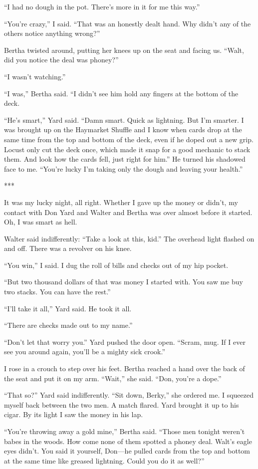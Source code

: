 \documentclass{novel}
\begin{document}
{“I had no dough in the pot. There’s more in it for me this way.”

“You’re crazy,” I said. “That was an honestly dealt hand. Why didn’t any of the others notice anything wrong?”

Bertha twisted around, putting her knees up on the seat and facing us. “Walt, did you notice the deal was phoney?”

“I wasn’t watching.”

“I was,” Bertha said. “I didn’t see him hold any fingers at the bottom of the deck.

“He’s smart,” Yard said. “Damn smart. Quick as lightning. But I’m smarter. I was brought up on the Haymarket Shuffle and I know when cards drop at the same time from the top and bottom of the deck, even if he doped out a new grip. Locust only cut the deck once, which made it snap for a good mechanic to stack them. And look how the cards fell, just right for him.” He turned his shadowed face to me. “You’re lucky I’m taking only the dough and leaving your health.”

***

It was my lucky night, all right. Whether I gave up the money or didn’t, my contact with Don Yard and Walter and Bertha was over almost before it started. Oh, I was smart as hell.

Walter said indifferently: “Take a look at this, kid.” The overhead light flashed on and off. There was a revolver on his knee.

“You win,” I said. I dug the roll of bills and checks out of my hip pocket.

“But two thousand dollars of that was money I started with. You saw me buy two stacks. You can have the rest.”

“I’ll take it all,” Yard said. He took it all.

“There are checks made out to my name.”

“Don’t let that worry you.” Yard pushed the door open. “Scram, mug. If I ever see you around again, you’ll be a mighty sick crook.”

I rose in a crouch to step over his feet. Bertha reached a hand over the back of the seat and put it on my arm. “Wait,” she said. “Don, you’re a dope.”

“That so?” Yard said indifferently. “Sit down, Berky,” she ordered me. I squeezed myself back between the two men. A match flared. Yard brought it up to his cigar. By its light I saw the money in his lap.

“You’re throwing away a gold mine,” Bertha said. “Those men tonight weren’t babes in the woods. How come none of them spotted a phoney deal. Walt’s eagle eyes didn’t. You said it yourself, Don—he pulled cards from the top and bottom at the same time like greased lightning. Could you do it as well?”

}
\end{document}
